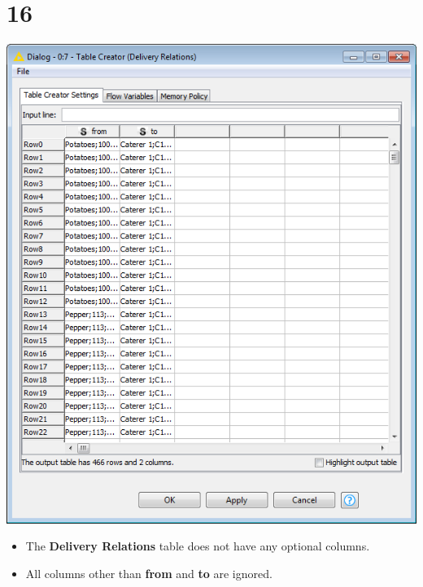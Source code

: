 \documentclass{beamer}
\begin{document}
\section{16}
\begin{frame}
	\begin{center}
  		\includegraphics[height=0.6\textheight]{16.png}
	\end{center}
	\begin{itemize}
		\item The \textbf{Delivery Relations} table does not have any optional columns.
		\item All columns other than \textbf{from} and \textbf{to} are ignored.
	\end{itemize}
\end{frame}
\end{document}

